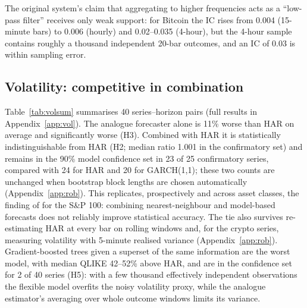 The original system's claim that aggregating to higher frequencies acts as a ``low-pass filter''
receives only weak support: for Bitcoin the IC rises from 0.004 (15-minute bars) to 0.006
(hourly) and 0.02--0.035 (4-hour), but the 4-hour sample contains roughly a thousand independent
20-bar outcomes, and an IC of 0.03 is within sampling error.

\begin{table}[t]
\centering\scriptsize
\caption{Direction. IC: out-of-sample Spearman correlation between the analogue forecast and the
realised trade R-multiple. Sharpe ratios at 5\,bp per side. DSR: deflated Sharpe ratio of the
walk-forward-selected v2 over its 18-configuration grid.}
\label{tab:direction}
\resizebox{\linewidth}{!}{}
\end{table}

\subsection{Volatility: competitive in combination}
Table~\ref{tab:volsum} summarises 40 series--horizon pairs (full results in
Appendix~\ref{app:vol}). The analogue forecaster alone is 11\% worse than HAR on average and
significantly worse (H3). Combined with HAR it is statistically indistinguishable from HAR (H2;
median ratio 1.001 in the confirmatory set) and remains in the 90\% model confidence set in 23 of
25 confirmatory series, compared with 24 for HAR and 20 for GARCH(1,1); these two counts are
unchanged when bootstrap block lengths are chosen automatically (Appendix~\ref{app:rob}). This
replicates, prospectively and across asset classes, the finding of \citet{andrada2016} for the
S\&P 100: combining nearest-neighbour and model-based forecasts does not reliably improve
statistical accuracy. The tie also survives re-estimating HAR at every bar on rolling windows and,
for the crypto series, measuring volatility with 5-minute realised variance
(Appendix~\ref{app:rob}). Gradient-boosted trees
given a superset of the same information are the worst model, with median QLIKE 42--52\% above
HAR, and are in the confidence set for 2 of 40 series (H5): with a few thousand effectively independent observations
the flexible model overfits the noisy volatility proxy, while the analogue estimator's
averaging over whole outcome windows limits its variance.

\begin{table}[t]
\centering\scriptsize
\caption{Volatility forecasting summary (QLIKE relative to HAR; lower is better).}
\label{tab:volsum}
\resizebox{\linewidth}{!}{}
\end{table}

